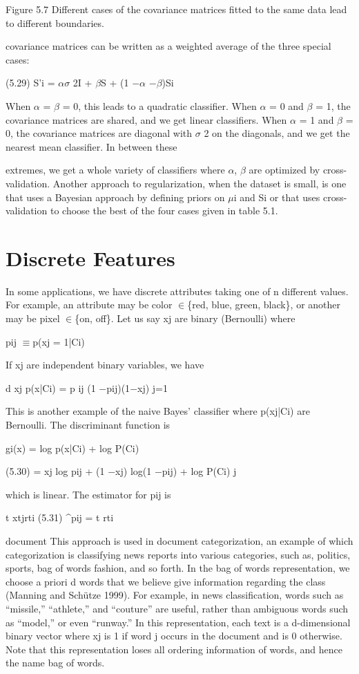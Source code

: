 Figure 5.7 Different cases of the covariance matrices fitted to the same data lead to different boundaries.

covariance matrices can be written as a weighted average of the three special cases:

(5.29) S'i = $\alpha$$\sigma$ 2I + $\beta$S + (1 $-$$\alpha$ $-$$\beta$)Si

When $\alpha$ = $\beta$ = 0, this leads to a quadratic classifier. When $\alpha$ = 0 and $\beta$ = 1, the covariance matrices are shared, and we get linear classifiers. When $\alpha$ = 1 and $\beta$ = 0, the covariance matrices are diagonal with $\sigma$ 2 on the diagonals, and we get the nearest mean classifier. In between these

extremes, we get a whole variety of classifiers where $\alpha$, $\beta$ are optimized by cross-validation. Another approach to regularization, when the dataset is small, is one that uses a Bayesian approach by defining priors on $\mu$i and Si or that uses cross-validation to choose the best of the four cases given in table 5.1.

\section{Discrete Features}

In some applications, we have discrete attributes taking one of n different values. For example, an attribute may be color $\in$\{red, blue, green, black\}, or another may be pixel $\in$\{on, off\}. Let us say xj are binary (Bernoulli) where

pij $\equiv$p(xj = 1|Ci)

If xj are independent binary variables, we have

d xj p(x|Ci) = p ij (1 $-$pij)(1$-$xj) j=1

This is another example of the naive Bayes’ classifier where p(xj|Ci) are Bernoulli. The discriminant function is

gi(x) = log p(x|Ci) + log P(Ci)

(5.30) = xj log pij + (1 $-$xj) log(1 $-$pij) + log P(Ci) j

which is linear. The estimator for pij is

t xtjrti (5.31) \textasciicircum{}pij = t rti

document This approach is used in document categorization, an example of which categorization is classifying news reports into various categories, such as, politics, sports, bag of words fashion, and so forth. In the bag of words representation, we choose a priori d words that we believe give information regarding the class (Manning and Schütze 1999). For example, in news classification, words such as “missile,” “athlete,” and “couture” are useful, rather than ambiguous words such as “model,” or even “runway.” In this representation, each text is a d-dimensional binary vector where xj is 1 if word j occurs in the document and is 0 otherwise. Note that this representation loses all ordering information of words, and hence the name bag of words.

